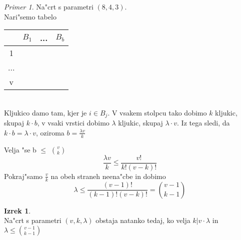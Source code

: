 \documentclass[a4paper,12pt]{article}
\theoremstyle{definition}
\newtheorem{theorem}[counter]{Izrek}
\theoremstyle{remark}
\newtheorem*{ex}{Primer}
\begin{document}
\begin{ex}
	Na"crt s parametri $(8, 4, 3)$.\\
	Nari"semo tabelo
	\begin{tabular}{c|c c c}
		& $B_1$ & ... & $B_b$ \\
		\hline
		1 \\
		...\\
		v
	\end{tabular}\\
	Kljukico damo tam, kjer je $i \in B_j$. V vsakem stolpcu tako dobimo $k$ kljukic, skupaj $k\cdot b$, v vsaki vrstici dobimo $\lambda$ kljukic, skupaj $\lambda \cdot v$. Iz tega sledi, da $k \cdot b = \lambda \cdot v$, oziroma $b = \frac{\lambda v}{k}$
	
	Velja "se b $\leqslant$ $\binom{v}{k}$
	\[\frac{\lambda v}{k} \leqslant \frac{v!}{k! (v-k)!}\]
	Pokraj"samo $\frac{v}{k}$ na obeh straneh neena"cbe in dobimo
	\[\lambda \leqslant \frac{(v - 1)!}{(k - 1)! (v - k)!} = \binom{v-1}{k-1}\]
\end{ex}

\begin{theorem}\mbox{}\\
	Na"crt s parametri $(v, k, \lambda)$ obstaja natanko tedaj, ko velja $k | v\cdot \lambda$ in $\lambda \leqslant \binom{v - 1}{k - 1}$
\end{theorem}
\end{document}
